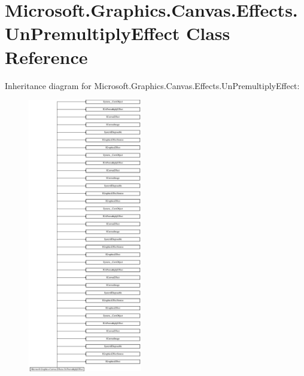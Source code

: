 \hypertarget{class_microsoft_1_1_graphics_1_1_canvas_1_1_effects_1_1_un_premultiply_effect}{}\section{Microsoft.\+Graphics.\+Canvas.\+Effects.\+Un\+Premultiply\+Effect Class Reference}
\label{class_microsoft_1_1_graphics_1_1_canvas_1_1_effects_1_1_un_premultiply_effect}
Inheritance diagram for Microsoft.\+Graphics.\+Canvas.\+Effects.\+Un\+Premultiply\+Effect\+:\begin{figure}[H]
\begin{center}
\leavevmode
\includegraphics[height=12.000000cm]{class_microsoft_1_1_graphics_1_1_canvas_1_1_effects_1_1_un_premultiply_effect}
\end{center}
\end{figure}
